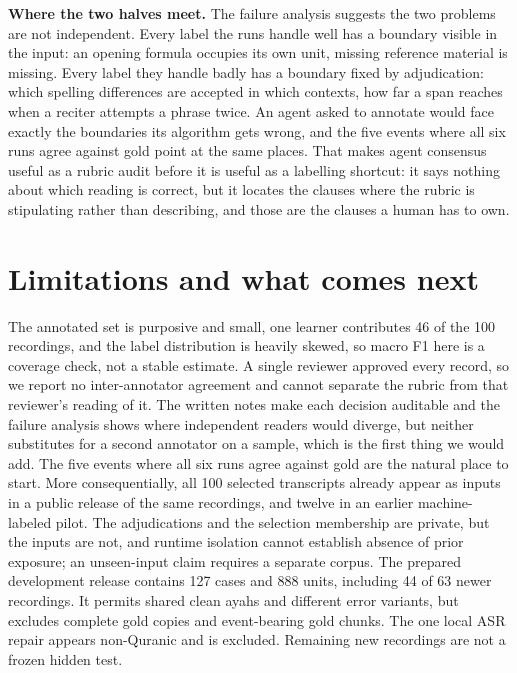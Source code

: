 \documentclass{article}
\begin{document}
\textbf{Where the two halves meet.} The failure analysis suggests the two problems are not independent. Every label the runs handle well has a boundary visible in the input: an opening formula occupies its own unit, missing reference material is missing. Every label they handle badly has a boundary fixed by adjudication: which spelling differences are accepted in which contexts, how far a span reaches when a reciter attempts a phrase twice. An agent asked to annotate would face exactly the boundaries its algorithm gets wrong, and the five events where all six runs agree against gold point at the same places. That makes agent consensus useful as a rubric audit before it is useful as a labelling shortcut: it says nothing about which reading is correct, but it locates the clauses where the rubric is stipulating rather than describing, and those are the clauses a human has to own.

\section{Limitations and what comes next}\label{sec:limits}
The annotated set is purposive and small, one learner contributes 46 of the 100 recordings, and the label distribution is heavily skewed, so macro F1 here is a coverage check, not a stable estimate. A single reviewer approved every record, so we report no inter-annotator agreement and cannot separate the rubric from that reviewer's reading of it. The written notes make each decision auditable and the failure analysis shows where independent readers would diverge, but neither substitutes for a second annotator on a sample, which is the first thing we would add. The five events where all six runs agree against gold are the natural place to start. More consequentially, all 100 selected transcripts already appear as inputs in a public release of the same recordings, and twelve in an earlier machine-labeled pilot. The adjudications and the selection membership are private, but the inputs are not, and runtime isolation cannot establish absence of prior exposure; an unseen-input claim requires a separate corpus. The prepared development release contains 127 cases and 888 units, including 44 of 63 newer recordings. It permits shared clean ayahs and different error variants, but excludes complete gold copies and event-bearing gold chunks. The one local ASR repair appears non-Quranic and is excluded. Remaining new recordings are not a frozen hidden test.
\end{document}
